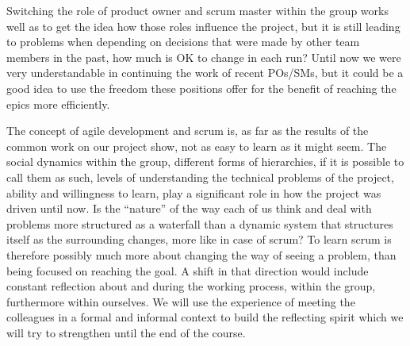 \documentclass{scrartcl}
\begin{document}
Switching the role of product owner and scrum master within the group works well as to get the idea how those roles influence the project, but it is still leading to problems when depending on decisions that were made by other team members in the past, how much is OK to change in each run? Until now we were very understandable in continuing the work of recent POs/SMs, but it could be a good idea to use the freedom these positions offer for the benefit of reaching the epics more efficiently.

The concept of agile development and scrum is, as far as the results of the common work on our project show, not as easy to learn as it might seem. The social dynamics within the group, different forms of hierarchies, if it is possible to call them as such, levels of understanding the technical problems of the project, ability and willingness to learn, play a significant role in how the project was driven until now. Is the “nature” of the way each of us think and deal with problems more structured as a waterfall than a dynamic system that structures itself as the surrounding changes, more like in case of scrum? To learn scrum is therefore possibly much more about changing the way of seeing a problem, than being focused on reaching the goal. A shift in that direction would include constant reflection about and during the working process, within the group, furthermore within ourselves. We will use the experience of meeting the colleagues in a formal and informal context to build the reflecting spirit which we will try to strengthen until the end of the course.
\end{document}
